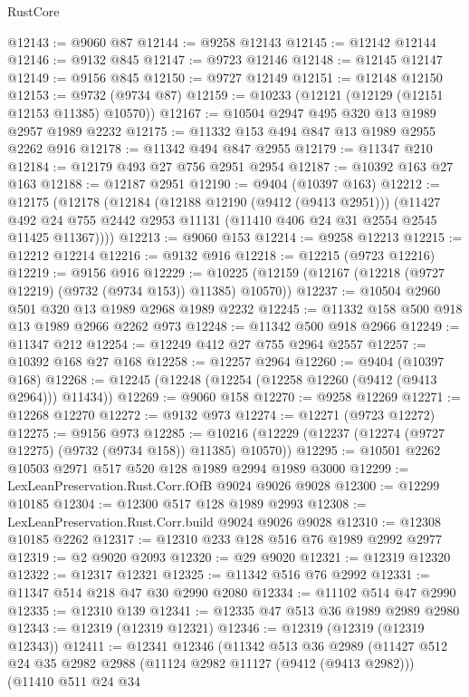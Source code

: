 \begin{lexlean}{RustCore}
\begin{coremodule}
@12143 := @9060 @87
@12144 := @9258 @12143
@12145 := @12142 @12144
@12146 := @9132 @845
@12147 := @9723 @12146
@12148 := @12145 @12147
@12149 := @9156 @845
@12150 := @9727 @12149
@12151 := @12148 @12150
@12153 := @9732 (@9734 @87)
@12159 := @10233 (@12121 (@12129 (@12151 @12153 @11385) @10570))
@12167 := @10504 @2947 @495 @320 @13 @1989 @2957 @1989 @2232
@12175 := @11332 @153 @494 @847 @13 @1989 @2955 @2262 @916
@12178 := @11342 @494 @847 @2955
@12179 := @11347 @210
@12184 := @12179 @493 @27 @756 @2951 @2954
@12187 := @10392 @163 @27 @163
@12188 := @12187 @2951
@12190 := @9404 (@10397 @163)
@12212 := @12175
    (@12178
      (@12184
        (@12188 @12190 (@9412 (@9413 @2951)))
        (@11427 @492 @24 @755 @2442 @2953 @11131 (@11410 @406 @24 @31 @2554 @2545 @11425 @11367))))
@12213 := @9060 @153
@12214 := @9258 @12213
@12215 := @12212 @12214
@12216 := @9132 @916
@12218 := @12215 (@9723 @12216)
@12219 := @9156 @916
@12229 := @10225 (@12159 (@12167 (@12218 (@9727 @12219) (@9732 (@9734 @153)) @11385) @10570))
@12237 := @10504 @2960 @501 @320 @13 @1989 @2968 @1989 @2232
@12245 := @11332 @158 @500 @918 @13 @1989 @2966 @2262 @973
@12248 := @11342 @500 @918 @2966
@12249 := @11347 @212
@12254 := @12249 @412 @27 @755 @2964 @2557
@12257 := @10392 @168 @27 @168
@12258 := @12257 @2964
@12260 := @9404 (@10397 @168)
@12268 := @12245 (@12248 (@12254 (@12258 @12260 (@9412 (@9413 @2964))) @11434))
@12269 := @9060 @158
@12270 := @9258 @12269
@12271 := @12268 @12270
@12272 := @9132 @973
@12274 := @12271 (@9723 @12272)
@12275 := @9156 @973
@12285 := @10216 (@12229 (@12237 (@12274 (@9727 @12275) (@9732 (@9734 @158)) @11385) @10570))
@12295 := @10501 @2262 @10503 @2971 @517 @520 @128 @1989 @2994 @1989 @3000
@12299 := LexLeanPreservation.Rust.Corr.fOfB @9024 @9026 @9028
@12300 := @12299 @10185
@12304 := @12300 @517 @128 @1989 @2993
@12308 := LexLeanPreservation.Rust.Corr.build @9024 @9026 @9028
@12310 := @12308 @10185 @2262
@12317 := @12310 @233 @128 @516 @76 @1989 @2992 @2977
@12319 := @2 @9020 @2093
@12320 := @29 @9020
@12321 := @12319 @12320
@12322 := @12317 @12321
@12325 := @11342 @516 @76 @2992
@12331 := @11347 @514 @218 @47 @30 @2990 @2080
@12334 := @11102 @514 @47 @2990
@12335 := @12310 @139
@12341 := @12335 @47 @513 @36 @1989 @2989 @2980
@12343 := @12319 (@12319 @12321)
@12346 := @12319 (@12319 (@12319 @12343))
@12411 := @12341
    @12346
    (@11342
      @513
      @36
      @2989
      (@11427
        @512
        @24
        @35
        @2982
        @2988
        (@11124 @2982 @11127 (@9412 (@9413 @2982)))
        (@11410
          @511
          @24
          @34

\end{coremodule}
\end{lexlean}
